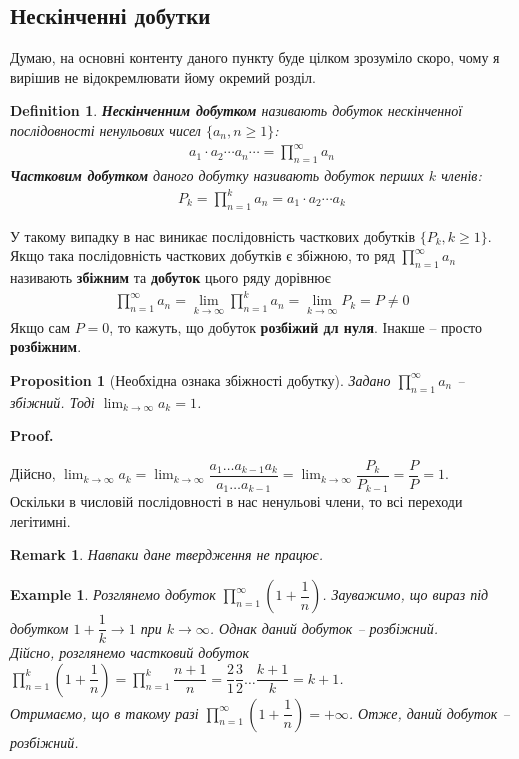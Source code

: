 \documentclass[a4paper, 10pt]{article}
\makeatletter
\def\qed{$\blacksquare$}
\theoremstyle{theoremdd}
\theoremstyle{theoremdd}
\theoremstyle{theoremdd}
\newtheorem{definition}[theorem]{Definition}
\theoremstyle{theoremdd}
\theoremstyle{theoremdd}
\newtheorem{example}[theorem]{Example}
\theoremstyle{theoremdd}
\newtheorem{proposition}[theorem]{Proposition}
\theoremstyle{theoremdd}
\newtheorem{remark}[theorem]{Remark}
\theoremstyle{theoremdd}
\theoremstyle{theoremdd}
\renewenvironment{proof}[1][Proof.\\]{\par
\pushQED{\hfill \qed}%
\normalfont \topsep6\p@\@plus6\p@\relax
\trivlist
\item\relax
{\bfseries
#1\@addpunct{.}}\hspace\labelsep\ignorespaces
}{%
\popQED\endtrivlist\@endpefalse
}
\makeatother
\begin{document}
\subsection{Нескінченні добутки}
Думаю, на основні контенту даного пункту буде цілком зрозуміло скоро, чому я вирішив не відокремлювати йому окремий розділ.

\begin{definition} 
\textbf{Нескінченним добутком} називають добуток нескінченної послідовності ненульових чисел $\{a_n, n \geq 1\}$:
\begin{align*}
a_1 \cdot a_2 \cdots a_n \cdots = \prod_{n=1}^{\infty} a_n
\end{align*}
\textbf{Частковим добутком} даного добутку називають добуток перших $k$ членів:
\begin{align*}
P_k = \prod_{n=1}^k a_n = a_1 \cdot a_2 \cdots a_k
\end{align*}
\end{definition}
У такому випадку в нас виникає послідовність часткових добутків $\{P_k, k \geq 1\}$.\\
Якщо така послідовність часткових добутків є збіжною, то ряд $\displaystyle \prod_{n=1}^{\infty} a_n$ називають \textbf{збіжним} та \textbf{добуток} цього ряду дорівнює
\begin{align*}
\prod_{n=1}^{\infty} a_n = \lim_{k \to \infty} \prod_{n=1}^k a_n = \lim_{k \to \infty} P_k = P \neq 0
\end{align*}
Якщо сам $P = 0$, то кажуть, що добуток \textbf{розбіжий дл нуля}. Інакше -- просто \textbf{розбіжним}.

\begin{proposition}[Необхідна ознака збіжності добутку]
Задано $\displaystyle\prod_{n=1}^\infty a_n$ -- збіжний. Тоді $\displaystyle\lim_{k \to \infty} a_k = 1$.
\end{proposition}

\begin{proof}
Дійсно, $\displaystyle\lim_{k \to \infty} a_k = \lim_{k \to \infty} \dfrac{a_1 \dots a_{k-1} a_k}{a_1 \dots a_{k-1}} = \lim_{k \to \infty} \dfrac{P_k}{P_{k-1}} = \dfrac{P}{P} = 1$.\\
Оскільки в числовій послідовності в нас ненульові члени, то всі переходи легітимні.
\end{proof}

\begin{remark}
Навпаки дане твердження не працює.
\end{remark}

\begin{example}
Розглянемо добуток $\displaystyle\prod_{n=1}^\infty \left( 1 + \dfrac{1}{n} \right)$. Зауважимо, що вираз під добутком $1 + \dfrac{1}{k} \to 1$ при $k \to \infty$. Однак даний добуток -- розбіжний.\\
Дійсно, розглянемо частковий добуток $\displaystyle\prod_{n=1}^k \left( 1 + \dfrac{1}{n} \right) = \prod_{n=1}^k \dfrac{n+1}{n} = \dfrac{2}{1} \dfrac{3}{2} \dots \dfrac{k+1}{k} = k+1$.\\
Отримаємо, що в такому разі $\displaystyle\prod_{n=1}^\infty \left( 1 + \dfrac{1}{n} \right) = +\infty$. Отже, даний добуток -- розбіжний.
\end{example}
\end{document}
